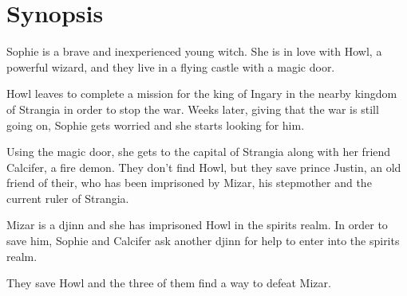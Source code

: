 \section{Synopsis}

Sophie is a brave and inexperienced young witch. She is in love with Howl, a powerful wizard, and they live in a flying castle with a magic door.

Howl leaves to complete a mission for the king of Ingary in the nearby kingdom of Strangia in order to stop the war. Weeks later, giving that the war is still going on, Sophie gets worried and she starts looking for him.

Using the magic door, she gets to the capital of Strangia along with her friend Calcifer, a fire demon. They don’t find Howl, but they save prince Justin, an old friend of their, who has been imprisoned by Mizar, his stepmother and the current ruler of Strangia.

Mizar is a djinn and she has imprisoned Howl in the spirits realm. In order to save him, Sophie and Calcifer ask another djinn for help to enter into the spirits realm.

They save Howl and the three of them find a way to defeat Mizar.

